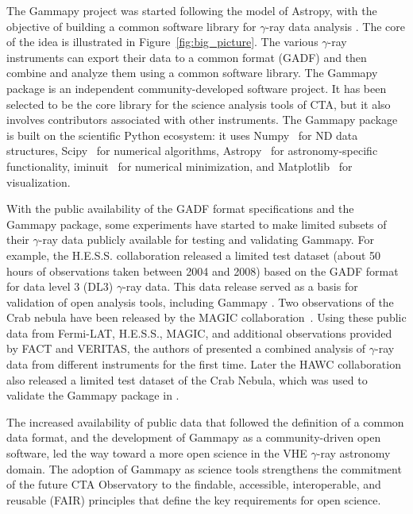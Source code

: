\documentclass[longauth]{aa}
\newcommand{\astropy}{Astropy\xspace}
\newcommand{\gammapy}{Gammapy\xspace}
\newcommand{\scipy}{Scipy\xspace}
\newcommand{\numpy}{Numpy\xspace}
\newcommand{\iminuit}{iminuit\xspace}
\newcommand{\matplotlib}{Matplotlib\xspace}
\newcommand{\hess}{H.E.S.S.\xspace}
\newcommand{\hawc}{HAWC\xspace}
\newcommand{\veritas}{VERITAS\xspace}
\newcommand{\magic}{MAGIC\xspace}
\newcommand{\cta}{CTA\xspace}
\newcommand{\fermi}{Fermi-LAT\xspace}
\newcommand{\gammaray}{$\gamma$-ray\xspace}
\newcommand{\gadf}{GADF\xspace}
\begin{document}
The \gammapy project was started following the model of \astropy, with the objective of building a common
software library for \gammaray data analysis \citep{gammapy_2015}. 
The core of the idea is illustrated in Figure~\ref{fig:big_picture}. The various \gammaray instruments
can export their data to a common format (\gadf) and then combine and analyze
them using a common software library.
The \gammapy package is an independent community-developed software project.
It has been selected to be the core library for the science analysis tools of \cta,
but it also involves contributors associated with other instruments.
The \gammapy package is built on the scientific Python ecosystem: it uses \numpy~\citep{numpy} for ND data
structures, \scipy~\citep{2020SciPy-NMeth} for numerical algorithms, \astropy~\citep{astropy} for
astronomy-specific functionality, \iminuit~\citep{iminuit} for numerical minimization,
and \matplotlib~\citep{matplotlib} for visualization.


With the public availability of the \gadf format specifications and the
\gammapy package, some experiments have started to make limited subsets of
their \gammaray data publicly available for testing and validating
\gammapy. For example, the \hess collaboration released a limited test
dataset (about 50 hours of observations taken between 2004 and 2008)
based on the \gadf format \citep{HESS_DR1} for data level 3 (DL3) \gammaray data.
This data release served as a basis for validation of open analysis tools, including \gammapy 
\cite[see e.g.,][]{Mohrmann2019}. Two observations of the Crab nebula have
been released by the \magic collaboration~\citep{magic_performance}.
Using these public data from \fermi, \hess, \magic, and additional observations
provided by FACT and \veritas, the authors of \cite{joint_crab} presented
a combined analysis of \gammaray data from different instruments for the first time.
Later the \hawc collaboration also released a limited test dataset of the Crab Nebula,
which was used to validate the \gammapy package in \cite{Olivera2022}.


The increased availability of public data that followed the definition of
a common data format, and the development of \gammapy as a community-driven open software,
led the way toward a more open science in the VHE \gammaray astronomy domain.
The adoption of \gammapy as science tools strengthens the commitment of the future \cta Observatory to the  findable, accessible, interoperable, and reusable (FAIR) principles \citep{FAIR16, FAIR22} 
that define the key requirements for open science.
\end{document}
